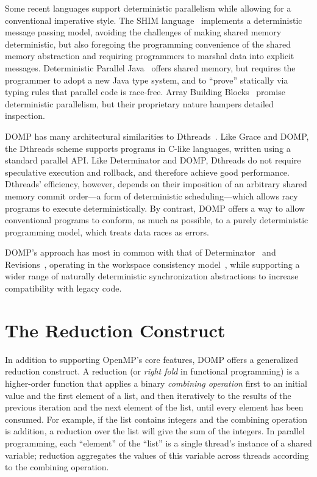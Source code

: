 Some recent languages support deterministic parallelism while allowing for a conventional imperative style. The SHIM language~\cite{edwards06shim, edwards08programming, tardieu06scheduling} implements a deterministic message passing model, avoiding the challenges of making shared memory deterministic, but also foregoing the programming convenience of the shared memory abstraction and requiring programmers to marshal data into explicit messages. Deterministic Parallel Java~\cite{bocchino09dpj} offers shared memory, but requires the programmer to adopt a new Java type system, and to ``prove'' statically via typing rules that parallel code is race-free.  Array Building Blocks~\cite{ghuloum10arbb} promise deterministic parallelism, but their proprietary nature hampers detailed inspection.

DOMP has many architectural similarities to Dthreads~\cite{liu11dthreads}.  Like Grace and DOMP, the Dthreads scheme supports programs in C-like languages, written using a standard parallel API.  Like Determinator and DOMP, Dthreads do not require speculative execution and rollback, and therefore achieve good performance.  Dthreads' efficiency, however, depends on their imposition of an arbitrary shared memory commit order---a form of deterministic scheduling---which allows racy programs to execute deterministically.  By contrast, DOMP offers a way to allow conventional programs to conform, as much as possible, to a purely deterministic programming model, which treats data races as errors.

DOMP's approach has most in common with that of Determinator~\cite{ford10efficient} and Revisions~\cite{burckhardt10revisions}, operating in the workspace consistency model~\cite{aviram11workspace}, while supporting a wider range of naturally deterministic synchronization abstractions to increase compatibility with legacy code.

\section{The Reduction Construct}
\label{sec:background-reductions}
%
In addition to supporting OpenMP's core features, DOMP offers a generalized reduction construct.  A reduction (or \textit{right fold} in functional programming) is a higher-order function that applies a binary \textit{combining operation} first to an initial value and the first element of a list, and then iteratively to the results of the previous iteration and the next element of the list, until every element has been consumed.  For example, if the list contains integers and the combining operation is addition, a reduction over the list will give the sum of the integers. In parallel programming, each ``element'' of the ``list'' is a single thread's instance of a shared variable; reduction aggregates the values of this variable across threads according to the combining operation.


